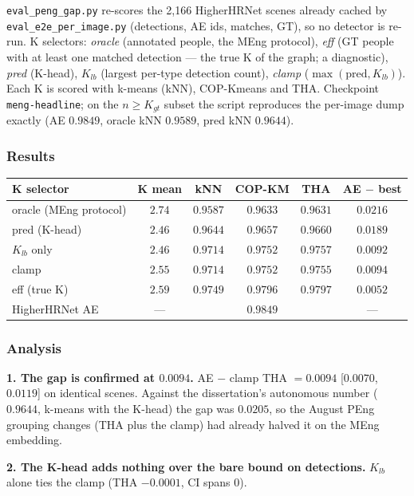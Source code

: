 \texttt{eval\_peng\_gap.py} re-scores the 2,166 HigherHRNet scenes already cached by \texttt{eval\_e2e\_per\_image.py} (detections, AE ids, matches, GT), so no detector is re-run.
K selectors: \emph{oracle} (annotated people, the MEng protocol), \emph{eff} (GT people with at least one matched detection --- the true K of the graph; a diagnostic), \emph{pred} (K-head), $K_{lb}$ (largest per-type detection count), \emph{clamp} ($\max(\text{pred}, K_{lb})$).
Each K is scored with k-means (kNN), COP-Kmeans and THA.
Checkpoint \texttt{meng-headline}; on the $n \geq K_{gt}$ subset the script reproduces the per-image dump exactly (AE $0.9849$, oracle kNN $0.9589$, pred kNN $0.9644$).

\subsubsection{Results}

\begin{tabular}{lccccc}
\hline
\textbf{K selector} & \textbf{K mean} & \textbf{kNN} & \textbf{COP-KM} & \textbf{THA} & \textbf{AE $-$ best} \\
\hline
oracle (MEng protocol) & $2.74$ & $0.9587$ & $0.9633$ & $0.9631$ & $0.0216$ \\
pred (K-head)          & $2.46$ & $0.9644$ & $0.9657$ & $0.9660$ & $0.0189$ \\
$K_{lb}$ only          & $2.46$ & $0.9714$ & $0.9752$ & $\mathbf{0.9757}$ & $0.0092$ \\
clamp                  & $2.55$ & $0.9714$ & $0.9752$ & $0.9755$ & $0.0094$ \\
eff (true K)           & $2.59$ & $0.9749$ & $0.9796$ & $0.9797$ & $0.0052$ \\
\hline
HigherHRNet AE         & ---    & \multicolumn{3}{c}{$0.9849$} & --- \\
\hline
\end{tabular}

\subsubsection{Analysis}

\textbf{1. The gap is confirmed at $0.0094$.} AE $-$ clamp THA $= 0.0094$ [$0.0070$, $0.0119$] on identical scenes. Against the dissertation's autonomous number ($0.9644$, k-means with the K-head) the gap was $0.0205$, so the August PEng grouping changes (THA plus the clamp) had already halved it on the MEng embedding.

\textbf{2. The K-head adds nothing over the bare bound on detections.} $K_{lb}$ alone ties the clamp (THA $-0.0001$, CI spans 0).

